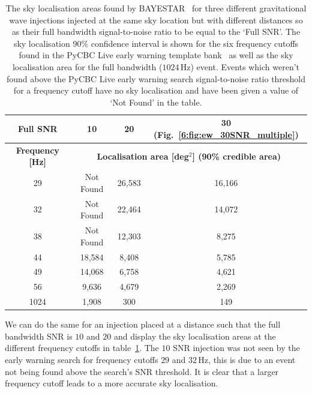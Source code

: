 \begin{table}[ht]
    \centering
    \setlength{\tabcolsep}{4pt}
    \begin{tabular}{cccc}
        \toprule
        \textbf{Full SNR} & \textbf{10} & \textbf{20} & \textbf{30 (Fig.~\ref{6:fig:ew_30SNR_multiple})} \\
        \midrule
        \textbf{Frequency [Hz]} & \multicolumn{3}{c}{\textbf{Localisation area [deg$^{2}$] (90\% credible area) }} \\
        \cmidrule(lr){2-4}
        29 & Not Found & 26,583 & 16,166 \\
        32 & Not Found & 22,464 & 14,072 \\
        38 & Not Found & 12,303 & 8,275 \\
        44 & 18,584 & 8,408 & 5,785 \\
        49 & 14,068 & 6,758 & 4,621 \\
        56 & 9,636 & 4,679 & 2,269 \\
        1024 & 1,908 & 300 & 149 \\
        \bottomrule
    \end{tabular}
    \caption{The sky localisation areas found by BAYESTAR~\cite{BAYESTAR:2016} for three different gravitational wave injections injected at the same sky location but with different distances so as their full bandwidth signal-to-noise ratio to be equal to the `Full SNR'. The sky localisation 90\% confidence interval is shown for the six frequency cutoffs found in the PyCBC Live early warning template bank~\cite{PyCBC_earlywarning:2020} as well as the sky localisation area for the full bandwidth ($1024 \, \text{Hz}$) event. Events which weren't found above the PyCBC Live early warning search signal-to-noise ratio threshold for a frequency cutoff have no sky localisation and have been given a value of `Not Found' in the table.}
    \label{6:tab:skymap_early_warning}
\end{table}
%

We can do the same for an injection placed at a distance such that the full bandwidth SNR is $10$ and $20$ and display the sky localisation areas at the different frequency cutoffs in table~\ref{6:tab:skymap_early_warning}. The $10$ SNR injection was not seen by the early warning search for frequency cutoffs $29$ and $32 \, \text{Hz}$, this is due to an event not being found above the search's SNR threshold. It is clear that a larger frequency cutoff leads to a more accurate sky localisation.


